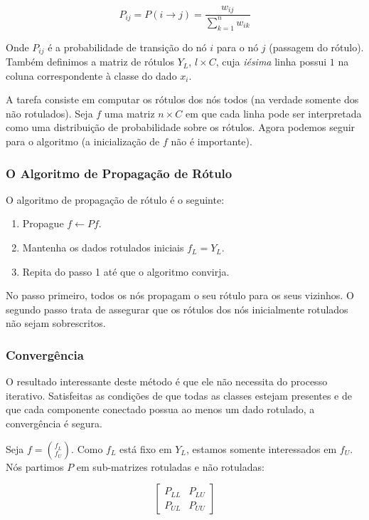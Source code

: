 \documentclass[12pt]{article}
\begin{document}
\begin{equation}
  P_{ij} = P(i \rightarrow j) = \frac{w_{ij}}{\sum_{k=1}^{n}w_{ik}}
\end{equation}

Onde $P_{ij}$ é a probabilidade de transição do nó $i$ para o nó $j$ (passagem do rótulo). Também definimos a matriz de rótulos $Y_L$, $l \times C$, cuja \emph{iésima} linha possui $1$ na coluna correspondente à classe do dado $x_i$. 

A tarefa consiste em computar os rótulos dos nós todos (na verdade somente dos não rotulados). Seja $f$ uma matriz $n \times C$ em que cada linha pode ser interpretada como uma distribuição de probabilidade sobre os rótulos. Agora podemos seguir para o algoritmo (a inicialização de $f$ não é importante).

\subsubsection{O Algoritmo de Propagação de Rótulo}


O algoritmo de propagação de rótulo é o seguinte:

\begin{enumerate}
  \item Propague $f \leftarrow Pf$.
  \item Mantenha os dados rotulados iniciais $f_L = Y_L$.
  \item Repita do passo 1 até que o algoritmo convirja.
\end{enumerate}

No passo primeiro, todos os nós propagam o seu rótulo para os seus vizinhos. O segundo passo trata de assegurar que os rótulos dos nós inicialmente rotulados não sejam sobrescritos.

\subsubsection{Convergência}
O resultado interessante deste método é que ele não necessita do processo iterativo. Satisfeitas as condições de que todas as classes estejam presentes e de que cada componente conectado possua ao menos um dado rotulado, a convergência é segura.

Seja $f = \binom{f_L}{f_U}$. Como $f_L$ está fixo em $Y_L$, estamos somente interessados em $f_U$. Nós partimos $P$ em sub-matrizes rotuladas e não rotuladas:

\begin{equation}
  \begin{bmatrix}
    P_{LL} & P_{LU}
    \\P_{UL} & P_{UU}
  \end{bmatrix}
\end{equation}
\end{document}
